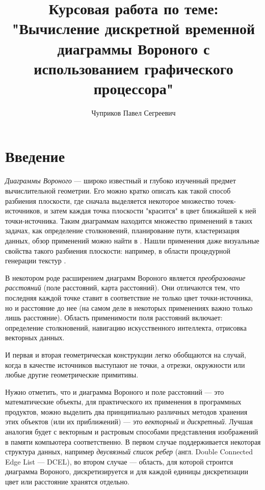 \documentclass[12pt]{article}
\author{Чуприков Павел Сегреевич}
\title{Курсовая работа по теме: "Вычисление дискретной временной диаграммы Вороного с использованием графического процессора"}
\begin{document}
\begin{titlepage}
\maketitle
\end{titlepage}

\tableofcontents

\pagebreak

\section{Введение}
\emph{Диаграммы Вороного} --- широко известный и глубоко изученный предмет вычислительной геометрии. Его можно кратко описать как такой способ разбиения плоскости, где сначала выделяется некоторое множество точек-источников, и затем каждая точка плоскости "красится" в цвет ближайшей к ней точки-источника. Таким диаграммам находится множество применений в таких задачах, как определение столкновений, планирование пути, кластеризация данных, обзор применений 
можно найти в \cite{survey}. Нашли применения даже визуальные свойства такого разбиения плоскости: например, в области процедурной генерации текстур \cite{proced}. 

В некотором роде расширением диаграмм Вороного является \emph{преобразование расстояний} (поле расстояний, карта расстояний). Они отличаются тем, что последняя каждой точке ставит в соответствие не только цвет точки-источника, но и расстояние до нее (на самом деле в некоторых применениях важно только лишь расстояние). Область применимости поля расстояний включает: определение столкновений, навигацию искусственного интеллекта, отрисовка векторных данных. 

И первая и вторая геометрическая конструкции легко обобщаются на случай, когда в качестве источников выступают не точки, а отрезки, окружности или любые другие геометрические примитивы. 

Нужно отметить, что и диаграмма Вороного и поле расстояний --- это математические объекты, для практического их применения в программных продуктов, можно выделить два принципиально различных методов хранения этих объектов (или их приближений) --- это \emph{векторный} и \emph{дискретный}. Лучшая аналогия будет с векторным и растровым способами представления изображений в памяти компьютера соответственно. В первом случае поддерживается некоторая структура данных, например \emph{двусвязный список ребер} (англ. Double Connected Edge List --- DCEL), во втором случае --- область, для которой строится диаграмма Вороного, дискретизируется и для каждой единицы дискретизации цвет или расстояние хранятся отдельно.
\end{document}
